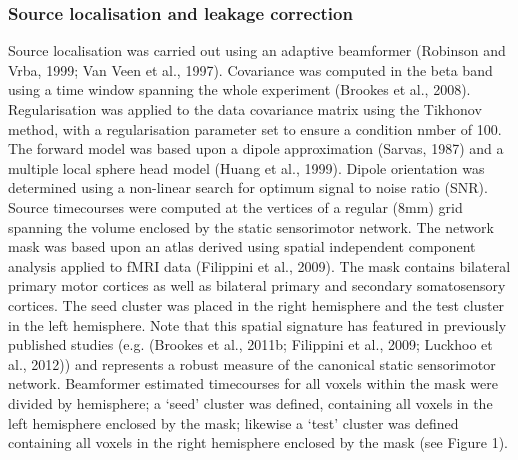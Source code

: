 \subsubsection{Source localisation and leakage correction}
Source localisation was carried out using an adaptive beamformer (Robinson and Vrba, 1999; Van Veen et al., 1997). Covariance was computed in the beta band using a time window spanning the whole experiment (Brookes et al., 2008). Regularisation was applied to the data covariance matrix using the Tikhonov method, with a regularisation parameter set to ensure a condition nmber of 100. The forward model was based upon a dipole approximation (Sarvas, 1987) and a multiple local sphere head model (Huang et al., 1999). Dipole orientation was determined using a non-linear search for optimum signal to noise ratio (SNR). Source timecourses were computed at the vertices of a regular (8mm) grid spanning the volume enclosed by the static sensorimotor network. The network mask was based upon an atlas derived using spatial independent component analysis applied to fMRI data (Filippini et al., 2009). The mask contains bilateral primary motor cortices as well as bilateral primary and secondary somatosensory cortices. The seed cluster was placed in the right hemisphere and the test cluster in the left hemisphere. Note that this spatial signature has featured in previously published studies (e.g. (Brookes et al., 2011b; Filippini et al., 2009; Luckhoo et al., 2012)) and represents a robust measure of the canonical static sensorimotor network. Beamformer estimated timecourses for all voxels within the mask were divided by hemisphere; a ‘seed’ cluster was defined, containing all voxels in the left hemisphere enclosed by the mask; likewise a ‘test’ cluster was defined containing all voxels in the right hemisphere enclosed by the mask (see Figure 1). 

